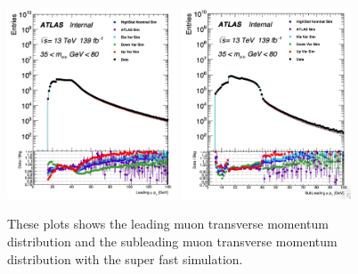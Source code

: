 \begin{figure}[!htb]
    \begin{center}
        \includegraphics[width=0.45\textwidth]{figures/chapter_dimuon/superfast_leadingMuonPT}
        \includegraphics[width=0.45\textwidth]{figures/chapter_dimuon/superfast_subleadingMuonPT}
        \caption{
        These plots shows the leading muon transverse momentum distribution and the subleading muon transverse momentum distribution with the super fast simulation.  }
    \end{center}
\end{figure}
\FloatBarrier





